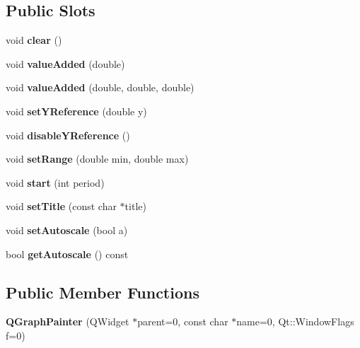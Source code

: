 \subsection*{Public Slots}
\begin{DoxyCompactItemize}
\item 
\mbox{\label{classQGraphPainter_a1bf39c73ba4583cc7b5ec16aea999b08}} 
void {\bfseries clear} ()
\item 
\mbox{\label{classQGraphPainter_a49a8c35d6cd08bcd9f43cbb8c6fcde89}} 
void {\bfseries value\+Added} (double)
\item 
\mbox{\label{classQGraphPainter_a3aef295cb722de0b3023ef831ed87fef}} 
void {\bfseries value\+Added} (double, double, double)
\item 
\mbox{\label{classQGraphPainter_ae6b9d1900cd97e61734f4c7294c748fe}} 
void {\bfseries set\+Y\+Reference} (double y)
\item 
\mbox{\label{classQGraphPainter_a57505657eb19bf2def835cbac32e4b5d}} 
void {\bfseries disable\+Y\+Reference} ()
\item 
\mbox{\label{classQGraphPainter_a007619fdc7f1c8befe7b52f48ac0460c}} 
void {\bfseries set\+Range} (double min, double max)
\item 
\mbox{\label{classQGraphPainter_a53cade68d51858dc2c9cef9d11730826}} 
void {\bfseries start} (int period)
\item 
\mbox{\label{classQGraphPainter_ab19d744eb3ff3869307d5bd0903980cb}} 
void {\bfseries set\+Title} (const char $\ast$title)
\item 
\mbox{\label{classQGraphPainter_a12270f365e21843aa8bac9846dc8daaa}} 
void {\bfseries set\+Autoscale} (bool a)
\item 
\mbox{\label{classQGraphPainter_aaef72c5af4bca12c192193676c36969e}} 
bool {\bfseries get\+Autoscale} () const
\end{DoxyCompactItemize}
\subsection*{Public Member Functions}
\begin{DoxyCompactItemize}
\item 
\mbox{\label{classQGraphPainter_a772389a69629d5b8e06b8dfdecdb7113}} 
{\bfseries Q\+Graph\+Painter} (Q\+Widget $\ast$parent=0, const char $\ast$name=0, Qt\+::\+Window\+Flags f=0)
\end{DoxyCompactItemize}
